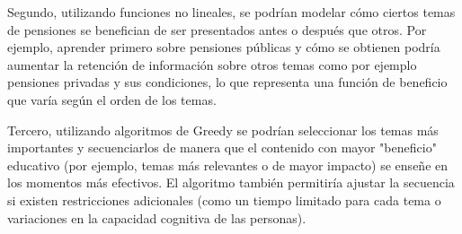 \documentclass{article}
\begin{document}
Segundo, utilizando funciones no lineales, se podrían modelar cómo ciertos temas de pensiones se benefician de ser presentados antes o después que otros. Por ejemplo, aprender primero sobre pensiones públicas y cómo se obtienen podría aumentar la retención de información sobre otros temas como por ejemplo pensiones privadas y sus condiciones, lo que representa una función de beneficio que varía según el orden de los temas.

Tercero, utilizando algoritmos de Greedy se podrían seleccionar los temas más importantes y secuenciarlos de manera que el contenido con mayor "beneficio" educativo (por ejemplo, temas más relevantes o de mayor impacto) se enseñe en los momentos más efectivos. El algoritmo también permitiría ajustar la secuencia si existen restricciones adicionales (como un tiempo limitado para cada tema o variaciones en la capacidad cognitiva de las personas).
\end{document}
